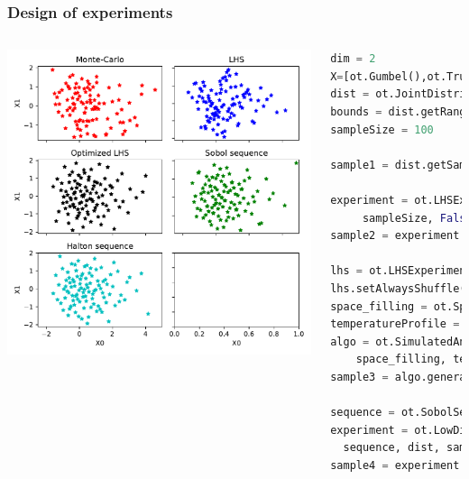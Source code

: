 \documentclass{beamer}
\begin{document}
\begin{frame}[containsverbatim]
\frametitle{Design of experiments}

\scriptsize{

\begin{columns}

    \includegraphics[width=1.\textwidth]{figures/DOE.pdf}

    
\tiny

\begin{lstlisting}[language=Python, numbers = none]
dim = 2
X=[ot.Gumbel(),ot.TruncatedNormal(0,1,-2,2)]
dist = ot.JointDistribution(X)
bounds = dist.getRange()
sampleSize = 100

sample1 = dist.getSample(sampleSize)

experiment = ot.LHSExperiment(dist,
	 sampleSize, False, False)
sample2 = experiment.generate()

lhs = ot.LHSExperiment(dist, sampleSize)
lhs.setAlwaysShuffle(True) # randomized
space_filling = ot.SpaceFillingC2()
temperatureProfile = ot.GeometricProfile(10.0, 0.95, 1000)
algo = ot.SimulatedAnnealingLHS(lhs, 
	space_filling, temperatureProfile)
sample3 = algo.generate()

sequence = ot.SobolSequence(dim) # or Halton
experiment = ot.LowDiscrepancyExperiment(
  sequence, dist, sampleSize, False)
sample4 = experiment.generate()

\end{lstlisting}
	
\end{columns}

}

\end{frame}
\end{document}
